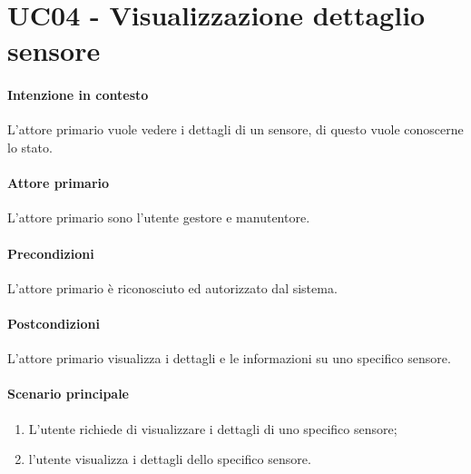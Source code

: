\section{UC04 - Visualizzazione dettaglio sensore}\label{uc:04}
\paragraph{Intenzione in contesto} L'attore primario vuole vedere i dettagli di un sensore, di questo vuole conoscerne lo stato.
\paragraph{Attore primario} L'attore primario sono l'utente gestore e manutentore.
\paragraph{Precondizioni} L'attore primario è riconosciuto ed autorizzato dal sistema.
\paragraph{Postcondizioni} L'attore primario visualizza i dettagli e le informazioni su uno specifico sensore.
\paragraph{Scenario principale}
\begin{enumerate}
    \item L'utente richiede di visualizzare i dettagli di uno specifico sensore;
    \item l'utente visualizza i dettagli dello specifico sensore.
\end{enumerate}